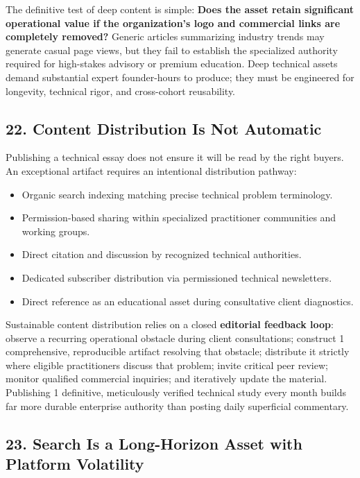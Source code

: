 The definitive test of deep content is simple: \textbf{Does the asset retain significant operational value if the organization's logo and commercial links are completely removed?} Generic articles summarizing industry trends may generate casual page views, but they fail to establish the specialized authority required for high-stakes advisory or premium education. Deep technical assets demand substantial expert founder-hours to produce; they must be engineered for longevity, technical rigor, and cross-cohort reusability.

\subsection*{22. Content Distribution Is Not Automatic}

Publishing a technical essay does not ensure it will be read by the right buyers. An exceptional artifact requires an intentional distribution pathway:
\begin{itemize}[leftmargin=*,itemsep=1pt]
  \item Organic search indexing matching precise technical problem terminology.
  \item Permission-based sharing within specialized practitioner communities and working groups.
  \item Direct citation and discussion by recognized technical authorities.
  \item Dedicated subscriber distribution via permissioned technical newsletters.
  \item Direct reference as an educational asset during consultative client diagnostics.
\end{itemize}

Sustainable content distribution relies on a closed \textbf{editorial feedback loop}: observe a recurring operational obstacle during client consultations; construct 1 comprehensive, reproducible artifact resolving that obstacle; distribute it strictly where eligible practitioners discuss that problem; invite critical peer review; monitor qualified commercial inquiries; and iteratively update the material. Publishing 1 definitive, meticulously verified technical study every month builds far more durable enterprise authority than posting daily superficial commentary.

\subsection*{23. Search Is a Long-Horizon Asset with Platform Volatility}

